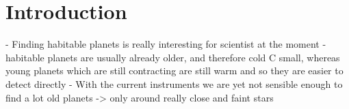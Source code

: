 \section{Introduction}

- Finding habitable planets is really interesting for scientist at the moment
- habitable planets are usually already older, and therefore cold C small, whereas young planets which are still contracting are still warm and so they are easier to detect directly 
-  With the current instruments we are yet not sensible enough to find a lot old planets -> only around really close and faint stars

